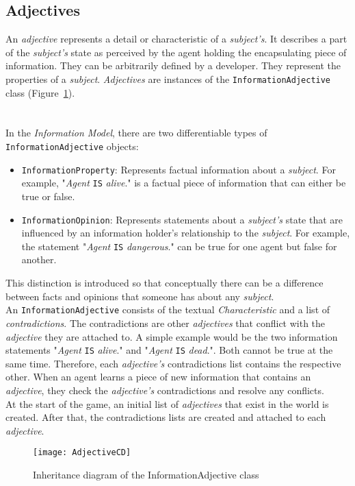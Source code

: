 \subsection{Adjectives}
An \textit{adjective} represents a detail or characteristic of a \textit{subject's}. It describes a part of the \textit{subject's} state as perceived by the agent holding the encapsulating piece of information. They can be arbitrarily defined by a developer. They represent the properties of a \textit{subject}. \textit{Adjectives} are instances of the \verb|InformationAdjective| class (Figure~\ref{fig:adjectiveCD}).\\
\\\\
In the \textit{Information Model}, there are two differentiable types of \verb|InformationAdjective| objects:
\begin{itemize}
	\item \verb|InformationProperty|: Represents factual information about a \textit{subject}. For example, "\textit{Agent} \verb|IS| \textit{alive}." is a factual piece of information that can either be true or false.
	\item \verb|InformationOpinion|: Represents statements about a \textit{subject's} state that are influenced by an information holder's relationship to the \textit{subject}. For example, the statement "\textit{Agent} \verb|IS| \textit{dangerous}." can be true for one agent but false for another.
\end{itemize}
This distinction is introduced so that conceptually there can be a difference between facts and opinions that someone has about any \textit{subject}.\\
An \verb|InformationAdjective| consists of the textual \textit{Characteristic} and a list of \textit{contradictions}. The contradictions are other \textit{adjectives} that conflict with the \textit{adjective} they are attached to. A simple example would be the two information statements  "\textit{Agent} \verb|IS| \textit{alive}." and  "\textit{Agent} \verb|IS| \textit{dead}.". Both cannot be true at the same time. Therefore, each \textit{adjective's} contradictions list contains the respective other. When an agent learns a piece of new information that contains an \textit{adjective}, they check the \textit{adjective's} contradictions and resolve any conflicts.\\
At the start of the game, an initial list of \textit{adjectives} that exist in the world is created. After that, the contradictions lists are created and attached to each \textit{adjective}.
\begin{figure}
	\centering
	\texttt{[image: AdjectiveCD]}
	\caption{Inheritance diagram of the InformationAdjective class}
	\label{fig:adjectiveCD}
\end{figure}
